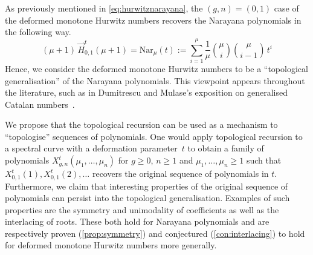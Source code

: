 \documentclass[a4paper]{article}
\theoremstyle{plain}
\numberwithin{theorem}{section}
\theoremstyle{definition}
\theoremstyle{remark}
\renewcommand{\geq}{\geqslant}
\newcommand{\HN}[3]{\vec{H}^t_{#1,#2}(#3)}
\begin{document}
As previously mentioned in \cref{eq:hurwitznarayana}, the $(g,n) = (0,1)$ case of the deformed monotone Hurwitz numbers recovers the Narayana polynomials in the following way.
\[
(\mu+1) \, \HN{0}{1}{\mu+1} = \mathrm{Nar}_{\mu}(t) := \sum_{i=1}^{\mu} \frac{1}{\mu} \binom{\mu}{i} \binom{\mu}{i-1} \, t^i
\]
Hence, we consider the deformed monotone Hurwitz numbers to be a ``topological generalisation'' of the Narayana polynomials. This viewpoint appears throughout the literature, such as in Dumitrescu and Mulase's exposition on generalised Catalan numbers~\cite{dum-mul18}.


We propose that the topological recursion can be used as a mechanism to ``topologise'' sequences of polynomials. One would apply topological recursion to a spectral curve with a deformation parameter~$t$ to obtain a family of polynomials $X_{g,n}^t(\mu_1, \ldots, \mu_n)$ for $g \geq 0$, $n \geq 1$ and $\mu_1, \ldots, \mu_n \geq 1$ such that $X^t_{0,1}(1), X^t_{0,1}(2), \ldots$ recovers the original sequence of polynomials in $t$. Furthermore, we claim that interesting properties of the original sequence of polynomials can persist into the topological generalisation. Examples of such properties are the symmetry and unimodality of coefficients as well as the interlacing of roots. These both hold for Narayana polynomials and are respectively proven (\cref{prop:symmetry}) and conjectured (\cref{con:interlacing}) to hold for deformed monotone Hurwitz numbers more generally.
\end{document}
